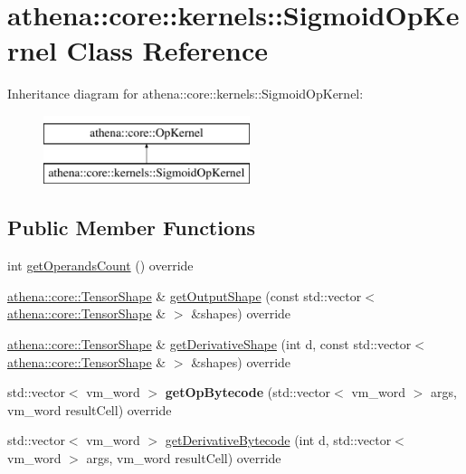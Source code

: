 \hypertarget{classathena_1_1core_1_1kernels_1_1_sigmoid_op_kernel}{}\section{athena\+:\+:core\+:\+:kernels\+:\+:Sigmoid\+Op\+Kernel Class Reference}
\label{classathena_1_1core_1_1kernels_1_1_sigmoid_op_kernel}
Inheritance diagram for athena\+:\+:core\+:\+:kernels\+:\+:Sigmoid\+Op\+Kernel\+:\begin{figure}[H]
\begin{center}
\leavevmode
\includegraphics[height=2.000000cm]{classathena_1_1core_1_1kernels_1_1_sigmoid_op_kernel}
\end{center}
\end{figure}
\subsection*{Public Member Functions}
\begin{DoxyCompactItemize}
\item 
int \mbox{\hyperlink{classathena_1_1core_1_1kernels_1_1_sigmoid_op_kernel_acb639510462e759a92747cec8c32358b}{get\+Operands\+Count}} () override
\item 
\mbox{\hyperlink{classathena_1_1core_1_1_tensor_shape}{athena\+::core\+::\+Tensor\+Shape}} \& \mbox{\hyperlink{classathena_1_1core_1_1kernels_1_1_sigmoid_op_kernel_a67e52f29a93f345ebf48801d835cef62}{get\+Output\+Shape}} (const std\+::vector$<$ \mbox{\hyperlink{classathena_1_1core_1_1_tensor_shape}{athena\+::core\+::\+Tensor\+Shape}} \& $>$ \&shapes) override
\item 
\mbox{\hyperlink{classathena_1_1core_1_1_tensor_shape}{athena\+::core\+::\+Tensor\+Shape}} \& \mbox{\hyperlink{classathena_1_1core_1_1kernels_1_1_sigmoid_op_kernel_af2ba51d6085f6d5326c1ab1281717ea8}{get\+Derivative\+Shape}} (int d, const std\+::vector$<$ \mbox{\hyperlink{classathena_1_1core_1_1_tensor_shape}{athena\+::core\+::\+Tensor\+Shape}} \& $>$ \&shapes) override
\item 
\mbox{\label{classathena_1_1core_1_1kernels_1_1_sigmoid_op_kernel_a728bbcf1fce2ae1173f45119ae0898fc}} 
std\+::vector$<$ vm\+\_\+word $>$ {\bfseries get\+Op\+Bytecode} (std\+::vector$<$ vm\+\_\+word $>$ args, vm\+\_\+word result\+Cell) override
\item 
std\+::vector$<$ vm\+\_\+word $>$ \mbox{\hyperlink{classathena_1_1core_1_1kernels_1_1_sigmoid_op_kernel_a38166ae2204692353efa2f6270714a80}{get\+Derivative\+Bytecode}} (int d, std\+::vector$<$ vm\+\_\+word $>$ args, vm\+\_\+word result\+Cell) override
\end{DoxyCompactItemize}
